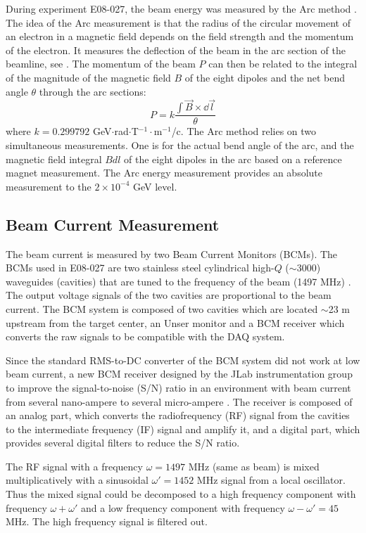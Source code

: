 During experiment E08-027, the beam energy was measured by the Arc method \cite{Alcorn2004}. The idea of the Arc measurement is that the radius of the circular movement of an electron in a magnetic field depends on the field strength and the momentum of the electron. It measures the deflection of the beam in the arc section of the beamline, see . The momentum of the beam $P$ can then be related to the integral of the magnitude of the magnetic field $B$ of the eight dipoles and the net bend angle $\theta$ through the arc sections:
\begin{equation} \label{C5S2SS1E1}
P = k \frac{\int\vec{B}\times\dd{\vec{l}}}{\theta}
\end{equation}
where $k=0.299792$ GeV$\cdot$rad$\cdot$T${}^{−1}\cdot$m${}^{−1}$/c. The Arc method relies on two simultaneous measurements. One is for the actual bend angle of the arc, and the magnetic field integral $Bdl$ of the eight dipoles in the arc based on a reference magnet measurement. The Arc energy measurement provides an absolute measurement to the $2\times10^{-4}$ GeV level.

\subsection{Beam Current Measurement}
\label{C5S2SS2}

The beam current is measured by two Beam Current Monitors (BCMs). The BCMs used in E08-027 are two stainless steel cylindrical high-$Q$ ($\sim$3000) waveguides (cavities) that are tuned to the frequency of the beam (1497 MHz) \cite{Alcorn2004}. The output voltage signals of the two cavities are proportional to the beam current. The BCM system is composed of two cavities which are located $\sim$23 m upstream from the target center, an Unser monitor and a BCM receiver which converts the raw signals to be compatible with the DAQ system.

Since the standard RMS-to-DC converter of the BCM system \cite{Denard2001} did not work at low beam current, a new BCM receiver designed by the JLab instrumentation group to improve the signal-to-noise (S/N) ratio in an environment with beam current from several nano-ampere to several micro-ampere \cite{Musson2012}. The receiver is composed of an analog part, which converts the radiofrequency (RF) signal from the cavities to the intermediate frequency (IF) signal and amplify it, and a digital part, which provides several digital filters to reduce the S/N ratio.

The RF signal with a frequency $\omega=1497$ MHz (same as beam) is mixed multiplicatively with a sinusoidal $\omega'=1452$ MHz signal from a local oscillator. Thus the mixed signal could be decomposed to a high frequency component with frequency $\omega+\omega'$ and a low frequency component with frequency $\omega-\omega'=45$ MHz. The high frequency signal is filtered out.

